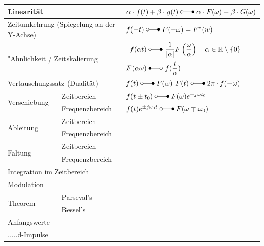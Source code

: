 	     
	\begin{tabular}{|p{3cm}|p{7cm}p{9cm}|}
		\hline
			\multicolumn{2}{|l}{Linearität}                                & $\alpha\cdot f(t) + \beta\cdot g(t) \; \laplace \; \alpha\cdot F(\omega) +\beta\cdot G(\omega)$                                                                                             \\ 
		\hline
			\multicolumn{2}{|l}{Zeitumkehrung (Spiegelung an der Y-Achse)} & $f(-t) \; \laplace \; F(-\omega) = F^*(w)$                                                                                                                                                  \\ 
		\hline
			\multicolumn{2}{|l}{"Ahnlichkeit / Zeitskalierung}             &      		$\begin{aligned}f(\alpha t) \; &\laplace \; \frac{1}{|\alpha|}F \left (\frac{\omega}{\alpha} \right)
				     		\quad\alpha \in\mathbb{R}\setminus \{0\}\\
				     		F(\alpha\omega) \; &\Laplace \; f(\frac{t}{\alpha})\end{aligned}$\\ 
		\hline
			\multicolumn{2}{|l}{Vertauschungssatz (Dualität)}              & $f(t) \; \laplace \; F(\omega)\nonumber$ \newline $F(t) \; \laplace \; 2\pi \cdot f(-\omega)$ \\ 
		\hline
		\hline
			\multirow{2}{*}{Verschiebung} & Zeitbereich & $f(t\pm t_0) \; \laplace \; F(\omega)e^{\pm j\omega t_0}$ \\ 
			\cline{2-3} 
			& Frequenzbereich & $f(t)e^{\pm j\omega_0 t} \; \laplace \; F(\omega\mp\omega_0)$ \\ 
   		\hline
   		\hline
	   		\multirow{2}{*}{Ableitung} & Zeitbereich & \\ 
	   		\cline{2-3} 
	   		& Frequenzbereich &  \\ 
   		\hline
   		\hline
	   		\multirow{2}{*}{Faltung} & Zeitbereich & \\ 
	   		\cline{2-3} 
	   		& Frequenzbereich &  \\ 
   		\hline
   		\hline
			\multicolumn{2}{|l}{Integration im Zeitbereich}              & \\ 
   		\hline
   		\hline
   			\multicolumn{2}{|l}{Modulation}              & \\ 
   		\hline
   		\hline
   			\multirow{2}{*}{Theorem} & Parseval's & \\ 
   			\cline{2-3} 
   			& Bessel's &  \\ 
   		\hline
   		\hline
		   	\multicolumn{2}{|l}{Anfangswerte}              & \\ 
		\hline
		\hline
		   	\multicolumn{2}{|l}{.....d-Impulse}              & \\ 
		\hline
		\hline
	\end{tabular}



